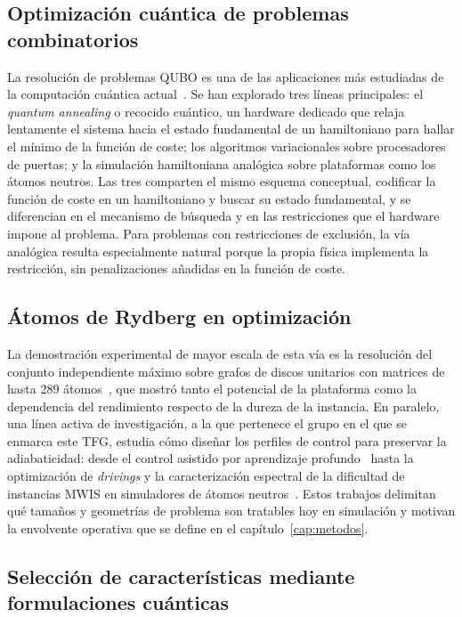 \subsection{Optimización cuántica de problemas combinatorios}

La resolución de problemas QUBO es una de las aplicaciones más
estudiadas de la computación cuántica actual~\cite{schuld2021,
wittek2014}. Se han explorado tres líneas principales: el
\textit{quantum annealing} o recocido cuántico, un hardware dedicado que
relaja lentamente el sistema hacia el estado fundamental de un
hamiltoniano para hallar el mínimo de la función de coste; los algoritmos
variacionales sobre procesadores de puertas; y la simulación
hamiltoniana analógica sobre plataformas como los átomos neutros. Las
tres comparten el mismo esquema conceptual, codificar la función de
coste en un hamiltoniano y buscar su estado fundamental, y se
diferencian en el mecanismo de búsqueda y en las restricciones que el
hardware impone al problema. Para problemas con restricciones de
exclusión, la vía analógica resulta especialmente natural porque la
propia física implementa la restricción, sin penalizaciones añadidas
en la función de coste.

\subsection{Átomos de Rydberg en optimización}

La demostración experimental de mayor escala de esta vía es la
resolución del conjunto independiente máximo sobre grafos de discos
unitarios con matrices de hasta 289 átomos~\cite{ebadi2022}, que
mostró tanto el potencial de la plataforma como la dependencia del
rendimiento respecto de la dureza de la instancia. En paralelo, una
línea activa de investigación, a la que pertenece el grupo en el que
se enmarca este TFG, estudia cómo diseñar los perfiles de control
para preservar la adiabaticidad: desde el control asistido por
aprendizaje profundo~\cite{ding2021} hasta la optimización de
\textit{drivings} y la caracterización espectral de la dificultad de
instancias MWIS en simuladores de átomos neutros~\cite{arribas2025}.
Estos trabajos delimitan qué tamaños y geometrías de problema son
tratables hoy en simulación y motivan la envolvente operativa que se
define en el capítulo~\ref{cap:metodos}.

\subsection{Selección de características mediante formulaciones cuánticas}

